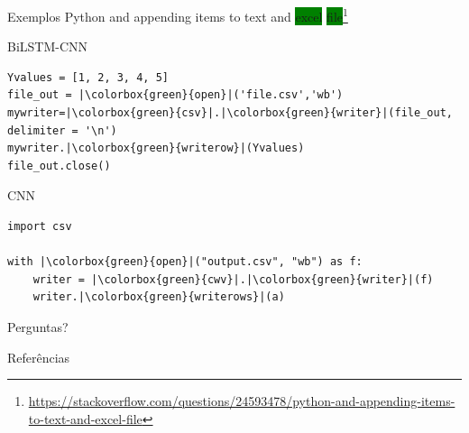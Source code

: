 \documentclass[10pt]{beamer}
\begin{document}
\begin{frame}[fragile]{Exemplos}
        \alert{Python and appending items to text and \colorbox{green}{excel} \colorbox{green}{file}}\footnote{{\tiny \url{https://stackoverflow.com/questions/24593478/python-and-appending-items-to-text-and-excel-file}}}
        \begin{exampleblock}{BiLSTM-CNN}
        \begin{verbatim}
Yvalues = [1, 2, 3, 4, 5]
file_out = |\colorbox{green}{open}|('file.csv','wb')
mywriter=|\colorbox{green}{csv}|.|\colorbox{green}{writer}|(file_out, delimiter = '\n')
mywriter.|\colorbox{green}{writerow}|(Yvalues)
file_out.close()
        \end{verbatim}
        \end{exampleblock}
        \begin{alertblock}{CNN}
        \begin{verbatim}
import csv

with |\colorbox{green}{open}|("output.csv", "wb") as f:
    writer = |\colorbox{green}{cwv}|.|\colorbox{green}{writer}|(f)
    writer.|\colorbox{green}{writerows}|(a)
    \end{verbatim}
    \end{alertblock}
    
\end{frame}




{
\begin{frame}[standout]
  Perguntas?
\end{frame}
}

\appendix


\begin{frame}[allowframebreaks]{Referências}

  
  

\end{frame}
\end{document}
